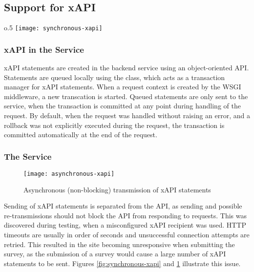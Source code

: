 \subsection{Support for xAPI}

        \begin{wrapfigure}{o}{.5\textwidth}
            \centering
            \texttt{[image: synchronous-xapi]}
            \caption{Synchronous (blocking) transmission of xAPI statements}
            \label{fig:synchronous-xapi}
        \end{wrapfigure}
        
    \subsubsection{xAPI in the  Service}
        xAPI statements are created in the backend service using an
        object-oriented API. Statements are queued locally using
        the  class, which acts as a transaction manager
        for xAPI statements. When a request context is created by the
        WSGI middleware, a new transcation is started. 
        Queued statements are only sent to the  service, 
        when the transaction is committed at any point during handling 
        of the request. By default, when the request was handled
        without raising an error, and a rollback was not explicitly
        executed during the request, the transaction is committed automatically
        at the end of the request.

    \subsubsection{The  Service}

        \begin{figure}
            \centering
            \texttt{[image: asynchronous-xapi]}
            \caption{Asynchronous (non-blocking) transmission of xAPI statements}
            \label{fig:asynchronous-xapi}
        \end{figure}

        Sending of xAPI statements is separated from the API, as sending and
        possible re-transmissions should not block the API from responding
        to requests. This was discovered during testing, when a misconfigured xAPI
        recipient was used. HTTP timeouts are usually in order of seconds and 
        unsuccessful connection attempts are retried. This resulted in
        the site becoming unresponsive when submitting the survey, as the submission
        of a survey would cause a large number of xAPI statements to be sent.
        Figures \ref{fig:synchronous-xapi} and \ref{fig:asynchronous-xapi} illustrate
        this issue.


